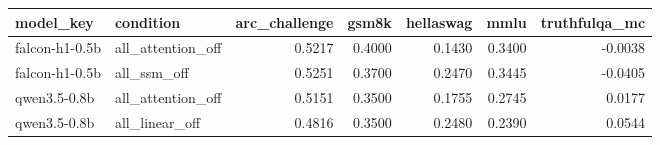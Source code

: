 \begin{tabular}{llrrrrr}
\toprule
model_key & condition & arc_challenge & gsm8k & hellaswag & mmlu & truthfulqa_mc \\
\midrule
falcon-h1-0.5b & all_attention_off & 0.5217 & 0.4000 & 0.1430 & 0.3400 & -0.0038 \\
falcon-h1-0.5b & all_ssm_off & 0.5251 & 0.3700 & 0.2470 & 0.3445 & -0.0405 \\
qwen3.5-0.8b & all_attention_off & 0.5151 & 0.3500 & 0.1755 & 0.2745 & 0.0177 \\
qwen3.5-0.8b & all_linear_off & 0.4816 & 0.3500 & 0.2480 & 0.2390 & 0.0544 \\
\bottomrule
\end{tabular}
